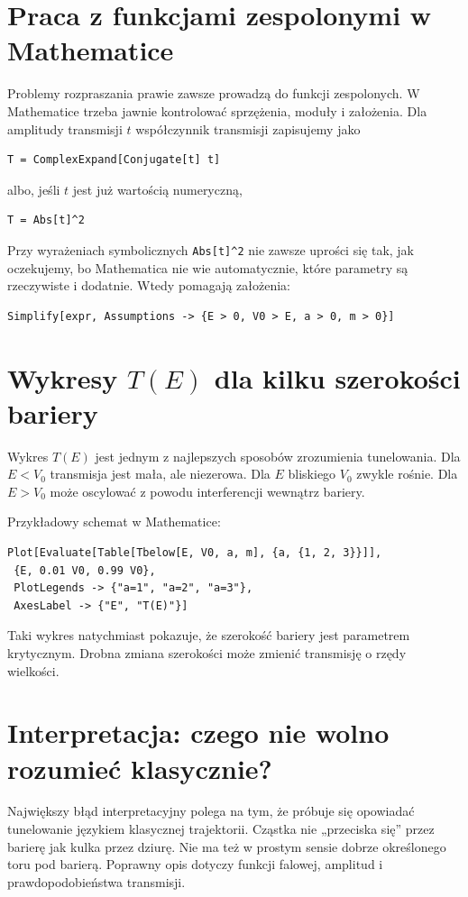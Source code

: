 \section{Praca z funkcjami zespolonymi w Mathematice}

Problemy rozpraszania prawie zawsze prowadzą do funkcji zespolonych. W Mathematice trzeba jawnie kontrolować sprzężenia, moduły i założenia. Dla amplitudy transmisji \(t\) współczynnik transmisji zapisujemy jako
\begin{verbatim}
T = ComplexExpand[Conjugate[t] t]
\end{verbatim}
albo, jeśli \(t\) jest już wartością numeryczną,
\begin{verbatim}
T = Abs[t]^2
\end{verbatim}

Przy wyrażeniach symbolicznych \texttt{Abs[t]\textasciicircum{}2} nie zawsze uprości się tak, jak oczekujemy, bo Mathematica nie wie automatycznie, które parametry są rzeczywiste i dodatnie. Wtedy pomagają założenia:
\begin{verbatim}
Simplify[expr, Assumptions -> {E > 0, V0 > E, a > 0, m > 0}]
\end{verbatim}

\section{Wykresy \texorpdfstring{\(T(E)\)}{T(E)} dla kilku szerokości bariery}

Wykres \(T(E)\) jest jednym z najlepszych sposobów zrozumienia tunelowania. Dla \(E<V_0\) transmisja jest mała, ale niezerowa. Dla \(E\) bliskiego \(V_0\) zwykle rośnie. Dla \(E>V_0\) może oscylować z powodu interferencji wewnątrz bariery.

Przykładowy schemat w Mathematice:
\begin{verbatim}
Plot[Evaluate[Table[Tbelow[E, V0, a, m], {a, {1, 2, 3}}]],
 {E, 0.01 V0, 0.99 V0},
 PlotLegends -> {"a=1", "a=2", "a=3"},
 AxesLabel -> {"E", "T(E)"}]
\end{verbatim}
Taki wykres natychmiast pokazuje, że szerokość bariery jest parametrem krytycznym. Drobna zmiana szerokości może zmienić transmisję o rzędy wielkości.

\section{Interpretacja: czego nie wolno rozumieć klasycznie?}

Największy błąd interpretacyjny polega na tym, że próbuje się opowiadać tunelowanie językiem klasycznej trajektorii. Cząstka nie „przeciska się” przez barierę jak kulka przez dziurę. Nie ma też w prostym sensie dobrze określonego toru pod barierą. Poprawny opis dotyczy funkcji falowej, amplitud i prawdopodobieństwa transmisji.

